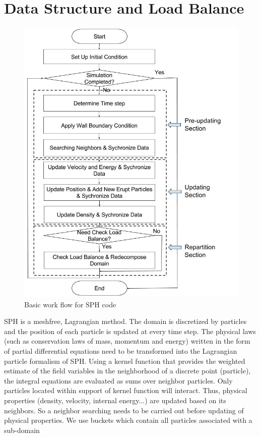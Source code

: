 \documentclass[conference,compsoc]{IEEEtran}
\begin{document}
\section{Data Structure and Load Balance}
\begin{figure}[!t]
\centering
\includegraphics[scale=0.34]{Work_flow}
\caption{Basic work flow for SPH code}
\label{fig:Work_flow}
\end{figure}
SPH is a meshfree, Lagrangian method. The domain is discretized by particles and the position of each particle is updated at every time step. The physical laws (such as conservation laws of mass, momentum and energy) written in the form of partial differential equations need to be transformed into the Lagrangian particle formalism of SPH. Using a kernel function that provides the weighted estimate of the field variables in the neighborhood of a discrete point (particle), the integral equations are evaluated as sums over neighbor particles. Only particles located within support of kernel function will interact. Thus, physical properties (density, velocity, internal energy...) are updated based on its neighbors. So a neighbor searching needs to be carried out before updating of physical properties. We use buckets which contain all particles associated with a sub-domain 
\end{document}
